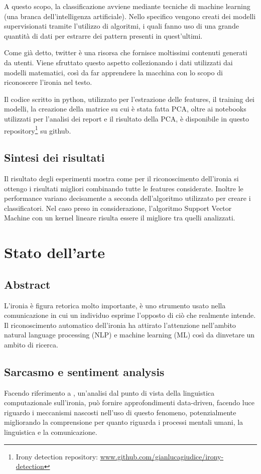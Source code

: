 \documentclass[oneside]{book}
\begin{document}
A questo scopo, la classificazione avviene mediante tecniche di machine learning (una branca dell'intelligenza artificiale). Nello specifico vengono creati dei modelli supervisionati tramite l'utilizzo di algoritmi, i quali fanno uso di una grande quantità di dati per estrarre dei pattern presenti in quest'ultimi.

Come già detto, twitter è una risorsa che fornisce moltissimi contenuti generati da utenti. Viene sfruttato questo aspetto collezionando i dati utilizzati dai modelli matematici, così da far apprendere la macchina con lo scopo di riconoscere l'ironia nel testo.

Il codice scritto in python, utilizzato per l'estrazione delle features, il training dei modelli, la creazione della matrice su cui è stata fatta PCA, oltre ai notebooks utilizzati per l'analisi dei report e il risultato della PCA, è disponibile in questo repository\footnote{Irony detection repository: \url{www.github.com/gianlucagiudice/irony-detection}} su github.

\section{Sintesi dei risultati}
Il risultato degli esperimenti mostra come per il riconoscimento dell'ironia si ottengo i risultati migliori combinando tutte le features considerate. Inoltre le performance variano decisamente a seconda dell'algoritmo utilizzato per creare i classificatori. Nel caso preso in considerazione, l'algoritmo Support Vector Machine con un kernel lineare risulta essere il migliore tra quelli analizzati.

\chapter{Stato dell'arte}

\section*{Abstract}
L'ironia è figura retorica molto importante, è uno strumento usato nella comunicazione in cui un individuo esprime l'opposto di ciò che realmente intende. Il riconoscimento automatico dell'ironia ha attirato l'attenzione nell'ambito natural language
processing (NLP) e machine learning (ML) così da dinvetare un ambito di ricerca. 

\section{Sarcasmo e sentiment analysis}
Facendo riferimento a \cite{survey4}, un'analisi dal punto di vista della linguistica computazionale sull'ironia, può fornire approfondimenti data-driven, facendo luce riguardo i meccanismi nascosti nell'uso di questo fenomeno, potenzialmente migliorando la comprensione per quanto riguarda i processi mentali umani, la linguistica e la comunicazione. 
\end{document}
